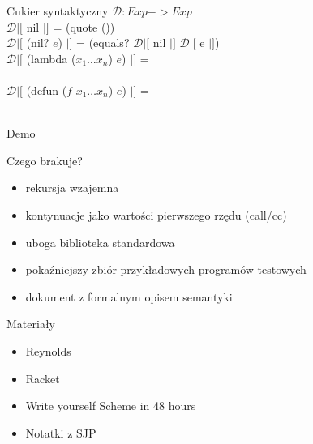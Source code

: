 \documentclass[12pt,serif]{beamer}
\begin{document}
\begin{frame}{Cukier syntaktyczny}
$\mathcal{D} : Exp -> Exp$ \newline
\\
$\mathcal{D}|[$ nil $|]$ = (quote ()) \\
$\mathcal{D}|[$ (nil? $e$) $|]$ = 
   (equals? $\mathcal{D}|[$ nil $|]$ $\mathcal{D}|[$ e $|]$) \newline
\\
$\mathcal{D}|[$ (lambda ($x_1 \ldots x_n$) $e$) $|]$ = \\
\newline
\\
$\mathcal{D}|[$ (defun ($f$ $x_1 \ldots x_n$) $e$) $|]$ = \\ 
\\

\end{frame}


\begin{frame}
\begin{center}
   \LARGE{Demo}
\end{center}
\end{frame}

\begin{frame}{Czego brakuje?}
\begin{itemize}
   \item rekursja wzajemna
   \item kontynuacje jako wartości pierwszego rzędu (call/cc)
   \item uboga biblioteka standardowa
   \item pokaźniejszy zbiór przykładowych programów testowych
   \item dokument z formalnym opisem semantyki
\end{itemize}
\end{frame}

\begin{frame}{Materiały}
\begin{itemize}
   \item Reynolds
   \item Racket
   \item Write yourself Scheme in 48 hours
   \item Notatki z SJP
\end{itemize}
\end{frame}
\end{document}
